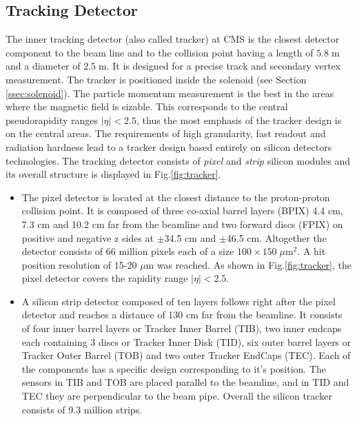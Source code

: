 \subsection{Tracking Detector}\label{sec:tracker}

The inner tracking detector\cite{TrackerTDR, CMSatLHC} (also called tracker) at CMS is the closest detector component to the beam line and to the collision point having a
length of $5.8\;$m and a diameter of $2.5\;$m. It is designed for a precise track and secondary vertex measurement. 
The tracker is positioned inside the solenoid (see Section \ref{ssec:solenoid}). The particle momentum measurement is the best in the areas where the magnetic field
is sizable. This corresponds to the central pseudorapidity ranges $|\eta| < 2.5$, thus the most emphasis of the tracker design is on the central
areas. The requirements of high granularity, fast readout and radiation hardness lead to a tracker design based entirely on silicon
detectors technologies. The tracking detector consists of \textit{pixel} and \textit{strip} silicon modules
and its overall structure is displayed in Fig.\ref{fig:tracker}.

\begin{itemize}
 \item The pixel detector is located at the closest distance to the proton-proton collision point. It is composed of three co-axial barrel layers (BPIX)
 4.4 cm, 7.3 cm and 10.2 cm far from the beamline and two forward discs (FPIX) on positive and negative z sides
 at $\pm$34.5 cm and $\pm$46.5 cm. Altogether the detector consists of 66 million pixels each of a size $100 \times 150\;\mu$m$^2$. A hit
 position resolution of 15-20 $\mu$m was reached\cite{TrackPerf}.
 As shown in Fig.\ref{fig:tracker}, the pixel detector covers the rapidity range $|\eta| < 2.5$.
 
 \item A silicon strip detector composed of ten layers follows right after the pixel detector and reaches a distance of 130 cm far
 from the beamline. It consists of four inner barrel layers or Tracker Inner Barrel (TIB), two inner endcaps each containing 3 discs
 or Tracker Inner Disk (TID), six outer barrel layers or Tracker Outer Barrel (TOB) and two outer Tracker EndCaps (TEC).
 Each of the components has a specific design corresponding to it's position. The sensors in TIB and TOB are placed parallel to the
 beamline, and in TID and TEC they are perpendicular to the beam pipe. Overall the silicon tracker consists of 9.3
 million strips.
\end{itemize}

